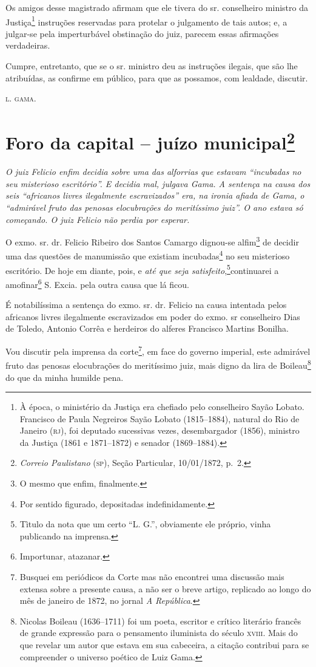 Os amigos desse magistrado afirmam que ele tivera do sr. conselheiro
ministro da Justiça\footnote{ À época, o ministério da Justiça era
  chefiado pelo conselheiro Sayão Lobato. Francisco de Paula Negreiros
  Sayão Lobato (1815--1884), natural do Rio de Janeiro (\textsc{rj}), foi deputado
  sucessivas vezes, desembargador (1856), ministro da Justiça (1861 e
  1871--1872) e senador (1869--1884).} instruções reservadas para protelar
o julgamento de tais autos; e, a julgar-se pela imperturbável obstinação
do juiz, parecem essas afirmações verdadeiras.

Cumpre, entretanto, que se o sr. ministro deu as instruções ilegais, que
são lhe atribuídas, as confirme em público, para que as possamos, com
lealdade, discutir.

\textsc{l. gama}.

\chapter{Foro da capital -- juízo municipal\footnote{\emph{Correio Paulistano} (\textsc{sp}), Seção Particular,
  10/01/1872, p.~2.}} %

\begin{didascalia}
\emph{O juiz Felicio enfim decidia sobre uma das alforrias que estavam
``incubadas no seu misterioso escritório''. E decidia mal, julgava Gama. A
sentença na causa dos seis ``africanos livres ilegalmente escravizados''
era, na ironia afiada de Gama, o ``admirável fruto das penosas
elocubrações do meritíssimo juiz''. O ano estava só começando. O juiz
Felicio não perdia por esperar.}
\end{didascalia}

O exmo. sr. dr. Felicio Ribeiro dos Santos Camargo dignou-se
alfim\footnote{ O mesmo que enfim, finalmente.} de decidir uma das
questões de manumissão que existiam incubadas\footnote{ Por sentido
  figurado, depositadas indefinidamente.} no seu misterioso escritório.
De hoje em diante, pois, e \emph{até que seja satisfeito},\footnote{ Tìtulo da nota que um certo ``L. G.'', obviamente ele próprio,
  vinha publicando na imprensa.}continuarei a amofinar\footnote{
  Importunar, atazanar.} S. Excia. pela outra causa que lá ficou.

É notabilíssima a sentença do exmo. sr. dr. Felicio na causa intentada
pelos africanos livres ilegalmente escravizados em poder do exmo. sr
conselheiro Dias de Toledo, Antonio Corrêa e herdeiros do alferes
Francisco Martins Bonilha.

Vou discutir pela imprensa da corte\footnote{ Busquei em periódicos da
  Corte mas não encontrei uma discussão mais extensa sobre a presente
  causa, a não ser o breve artigo, replicado ao longo do mês de janeiro
  de 1872, no jornal \emph{A República}.}, em face do governo imperial,
este admirável fruto das penosas elocubrações do meritíssimo juiz, mais
digno da lira de Boileau\footnote{Nicolas Boileau (1636--1711) foi um
  poeta, escritor e crítico literário francês de grande expressão para o
  pensamento iluminista do século \textsc{xviii}. Mais do que revelar um autor
  que estava em sua cabeceira, a citação contribui para se compreender o
  universo poético de Luiz Gama.} do que da minha humilde pena.

